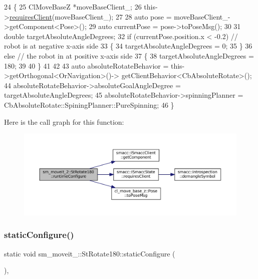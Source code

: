 \begin{DoxyCode}
24     \{
25         ClMoveBaseZ *moveBaseClient\_;
26         this->\hyperlink{classsmacc_1_1ISmaccState_a7f95c9f0a6ea2d6f18d1aec0519de4ac}{requiresClient}(moveBaseClient\_);
27 
28         \textcolor{keyword}{auto} pose = moveBaseClient\_->getComponent<Pose>();
29         \textcolor{keyword}{auto} currentPose = pose->toPoseMsg();
30 
31         \textcolor{keywordtype}{double} targetAbsoluteAngleDegrees;
32         \textcolor{keywordflow}{if} (currentPose.position.x < -0.2) \textcolor{comment}{// robot is at negative x-axis side}
33         \{
34                 targetAbsoluteAngleDegrees = 0;
35         \}
36         \textcolor{keywordflow}{else} \textcolor{comment}{// the robot in at positive x-axis side}
37         \{
38                 targetAbsoluteAngleDegrees = 180;
39              
40         \}
41 
42         
43         \textcolor{keyword}{auto} absoluteRotateBehavior = this->getOrthogonal<OrNavigation>()->
      getClientBehavior<CbAbsoluteRotate>();
44         absoluteRotateBehavior->absoluteGoalAngleDegree = targetAbsoluteAngleDegrees;
45         absoluteRotateBehavior->spinningPlanner = CbAbsoluteRotate::SpiningPlanner::PureSpinning;
46     \}
\end{DoxyCode}
Here is the call graph for this function\+:
\nopagebreak
\begin{figure}[H]
\begin{center}
\leavevmode
\includegraphics[width=350pt]{structsm__moveit__2_1_1StRotate180_a4c99c3cc7db072a3280fc7cd02e09f99_cgraph}
\end{center}
\end{figure}
\mbox{\label{structsm__moveit__2_1_1StRotate180_a2a2ba9d303c075ca5a6997c27194616b}} 
\subsubsection{\texorpdfstring{static\+Configure()}{staticConfigure()}}
{\footnotesize\ttfamily static void sm\+\_\+moveit\+\_\+::\+St\+Rotate180\+::static\+Configure (\begin{DoxyParamCaption}{ }\end{DoxyParamCaption})\hspace{0.3cm}{\ttfamily [inline]}, {\ttfamily [static]}}



